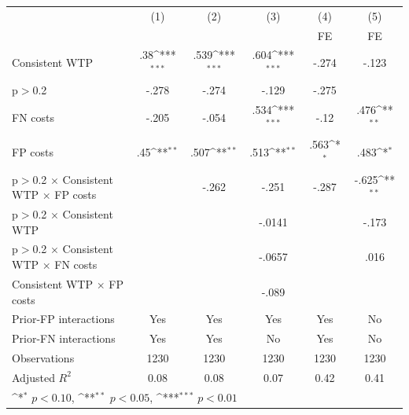 {
\def\sym#1{\ifmmode^{#1}\else\(^{#1}\)\fi}
\begin{tabular}{l*{5}{c}}
\hline\hline
                &\multicolumn{1}{c}{(1)}&\multicolumn{1}{c}{(2)}&\multicolumn{1}{c}{(3)}&\multicolumn{1}{c}{(4)}&\multicolumn{1}{c}{(5)}\\
                &\multicolumn{1}{c}{}&\multicolumn{1}{c}{}&\multicolumn{1}{c}{}&\multicolumn{1}{c}{FE}&\multicolumn{1}{c}{FE}\\
\hline
Consistent WTP  &      .38\sym{***}&     .539\sym{***}&     .604\sym{***}&    -.274         &    -.123         \\
p$>$0.2         &    -.278         &    -.274         &    -.129         &    -.275         &                  \\
FN costs        &    -.205         &    -.054         &     .534\sym{***}&     -.12         &     .476\sym{**} \\
FP costs        &      .45\sym{**} &     .507\sym{**} &     .513\sym{**} &     .563\sym{*}  &     .483\sym{*}  \\
p$>$0.2 $\times$ Consistent WTP $\times$ FP costs&                  &    -.262         &    -.251         &    -.287         &    -.625\sym{**} \\
p$>$0.2 $\times$ Consistent WTP&                  &                  &   -.0141         &                  &    -.173         \\
p$>$0.2 $\times$ Consistent WTP $\times$ FN costs&                  &                  &   -.0657         &                  &     .016         \\
Consistent WTP $\times$ FP costs&                  &                  &    -.089         &                  &                  \\
Prior-FP interactions&      Yes         &      Yes         &      Yes         &      Yes         &       No         \\
Prior-FN interactions&      Yes         &      Yes         &       No         &      Yes         &       No         \\
\hline
Observations    &     1230         &     1230         &     1230         &     1230         &     1230         \\
Adjusted \(R^{2}\)&     0.08         &     0.08         &     0.07         &     0.42         &     0.41         \\
\hline\hline
\multicolumn{6}{l}{\footnotesize \sym{*} \(p<0.10\), \sym{**} \(p<0.05\), \sym{***} \(p<0.01\)}\\
\end{tabular}
}
